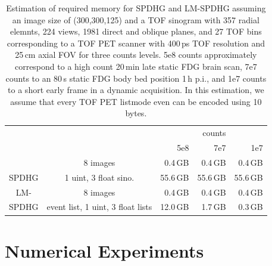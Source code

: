 \begin{table}
\begin{center}
\footnotesize
\begin{tabular}{ c c r r r}
         &                       &            & counts      & \\ 
         &                       & 5e8        & 7e7         & 1e7 \\ \hline
         & 8 images              &   0.4\,GB  &   0.4\,GB   &   0.4\,GB \\
SPDHG    & 1 uint, 3 float sino.&  55.6\,GB  &  55.6\,GB   &  55.6\,GB \\ \hline
LM-      & 8 images              &   0.4\,GB  &   0.4\,GB   &   0.4\,GB \\
SPDHG    & event list, 1 uint, 3 float lists &  12.0\,GB  &   1.7\,GB   &   0.3\,GB
\end{tabular}
\end{center}
\caption{Estimation of required memory for SPDHG and LM-SPDHG assuming an image size of (300,300,125)
         and a TOF sinogram with 357 radial elemnts, 224 views, 1981 direct and oblique planes, 
         and 27 TOF bins corresponding to a TOF PET scanner with 400\,ps TOF
         resolution and 25\,cm axial FOV for three counts levels. 
         5e8 counts approximately correspond to a high count 20\,min late static FDG brain scan, 
         7e7 counts to an 80\,s static FDG body bed position 1\,h p.i., 
         and 1e7 counts to a short early frame in a dynamic acquisition.
         In this estimation, we assume that every TOF PET listmode even can be encoded using 10 bytes.}
\label{tab:mem}
\end{table}


\section{Numerical Experiments}


